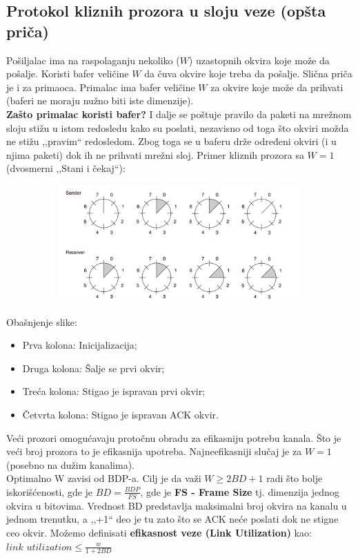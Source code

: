 \documentclass[a4paper]{article}
\begin{document}
    \subsection{Protokol kliznih prozora u sloju veze (opšta priča)}
        Pošiljalac ima na raspolaganju nekoliko ($W$) uzastopnih okvira koje može da pošalje. Koristi
        bafer veličine $W$ da čuva okvire koje treba da pošalje. Slična priča je i za primaoca. Primalac
        ima bafer veličine $W$ za okvire koje može da prihvati (baferi ne moraju nužno biti iste
        dimenzije). \\
        \indent \textbf{Zašto primalac koristi bafer?} I dalje se poštuje pravilo da paketi na mrežnom sloju
        stižu u istom redosledu kako su poslati, nezavisno od toga što okviri možda ne stižu ,,pravim``
        redosledom. Zbog toga se u baferu drže određeni okviri (i u njima paketi) dok ih ne prihvati
        mrežni sloj. Primer kliznih prozora sa $W = 1$ (dvosmerni ,,Stani i čekaj``):\\
        \begin{figure}[H]
            \begin{center}
                \includegraphics[width=120mm,height=45mm]{Slike/prozori1.png}
            \end{center}
        \end{figure}
        Obašnjenje slike: 
        \begin{itemize}
            \item Prva kolona: Inicijalizacija;
            \item Druga kolona: Šalje se prvi okvir;
            \item Treća kolona: Stigao je ispravan prvi okvir;
            \item Četvrta kolona: Stigao je ispravan ACK okvir.
        \end{itemize}
        Veći prozori omogućavaju protočnu obradu za efikasniju potrebu kanala. Što je veći
        broj prozora to je efikasnija upotreba. Najneefikasniji slučaj je za $W=1$ (posebno
        na dužim kanalima). \\
        \indent Optimalno W zavisi od BDP-a. Cilj je da važi $W \geq 2BD+1$ radi
        što bolje iskorišćenosti, gde je \textbf{$BD = \frac{BDP}{FS}$}, gde je \textbf{FS - Frame Size} 
        tj. dimenzija jednog okvira u bitovima. Vrednost BD predstavlja maksimalni broj okvira 
        na kanalu u
        jednom trenutku, a ,,+1`` deo je tu zato što se ACK neće poslati dok ne stigne ceo okvir.
        \indent Možemo definisati \textbf{efikasnost veze (Link Utilization)} kao:\\
        \indent $link$ $utilization \leq \frac{w}{1+2BD}$
\end{document}
